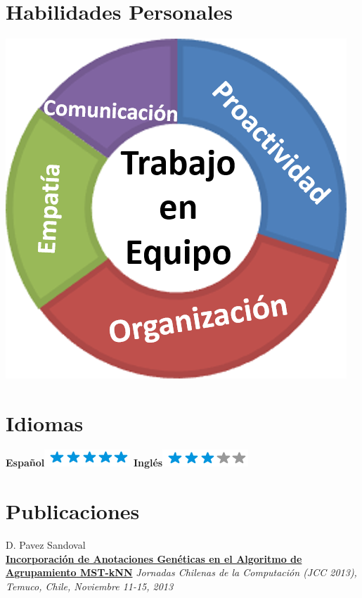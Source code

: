 \documentclass[]{friggeri-cv}
\begin{document}
\begin{aside}
    ~
    ~
    ~
  \section{Habilidades Personales}
    \includegraphics[scale=0.29]{img/Skills4.png}
    ~
  \section{Idiomas}
    \textbf{Espa{\~n}ol}\includegraphics[scale=0.40]{img/5stars.png}
    \textbf{Inglés}\includegraphics[scale=0.40]{img/3stars.png}
\end{aside}

\section{Publicaciones}
D. Pavez Sandoval\\
\href{http://jcc2013.inf.uct.cl/wp-content/proceedings/ET/Incorporacion\%20de\%20Anotaciones\%20Geneticas\%20en\%20el\%20Algoritmo\%20de\%20Agrupamiento\%20MST-kNN.pdf}{\textbf{Incorporaci{\'o}n de Anotaciones Gen{\'e}ticas en el Algoritmo de Agrupamiento MST-kNN}}
\emph{Jornadas Chilenas de la Computaci{\'o}n (JCC 2013), Temuco, Chile, Noviembre 11-15, 2013}
\\
\end{document}
